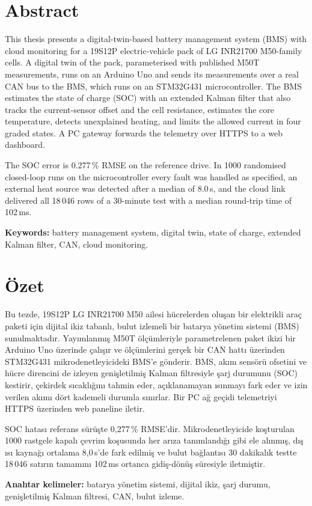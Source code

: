 \chapter*{Abstract}

This thesis presents a digital-twin-based battery management system (BMS) with cloud monitoring for a 19S12P electric-vehicle pack of LG INR21700 M50-family cells. A digital twin of the pack, parameterised with published M50T measurements, runs on an Arduino Uno and sends its measurements over a real CAN bus to the BMS, which runs on an STM32G431 microcontroller. The BMS estimates the state of charge (SOC) with an extended Kalman filter that also tracks the current-sensor offset and the cell resistance, estimates the core temperature, detects unexplained heating, and limits the allowed current in four graded states. A PC gateway forwards the telemetry over HTTPS to a web dashboard.

The SOC error is 0.277\,\% RMSE on the reference drive. In 1000 randomised closed-loop runs on the microcontroller every fault was handled as specified, an external heat source was detected after a median of 8.0\,s, and the cloud link delivered all 18\,046 rows of a 30-minute test with a median round-trip time of 102\,ms.

\textbf{Keywords:} battery management system, digital twin, state of charge, extended Kalman filter, CAN, cloud monitoring.

\chapter*{Özet}

Bu tezde, 19S12P LG INR21700 M50 ailesi hücrelerden oluşan bir elektrikli araç paketi için dijital ikiz tabanlı, bulut izlemeli bir batarya yönetim sistemi (BMS) sunulmaktadır. Yayımlanmış M50T ölçümleriyle parametrelenen paket ikizi bir Arduino Uno üzerinde çalışır ve ölçümlerini gerçek bir CAN hattı üzerinden STM32G431 mikrodenetleyicideki BMS'e gönderir. BMS, akım sensörü ofsetini ve hücre direncini de izleyen genişletilmiş Kalman filtresiyle şarj durumunu (SOC) kestirir, çekirdek sıcaklığını tahmin eder, açıklanamayan ısınmayı fark eder ve izin verilen akımı dört kademeli durumla sınırlar. Bir PC ağ geçidi telemetriyi HTTPS üzerinden web paneline iletir.

SOC hatası referans sürüşte 0,277\,\% RMSE'dir. Mikrodenetleyicide koşturulan 1000 rastgele kapalı çevrim koşusunda her arıza tanımlandığı gibi ele alınmış, dış ısı kaynağı ortalama 8,0\,s'de fark edilmiş ve bulut bağlantısı 30 dakikalık testte 18\,046 satırın tamamını 102\,ms ortanca gidiş-dönüş süresiyle iletmiştir.

\textbf{Anahtar kelimeler:} batarya yönetim sistemi, dijital ikiz, şarj durumu, genişletilmiş Kalman filtresi, CAN, bulut izleme.
